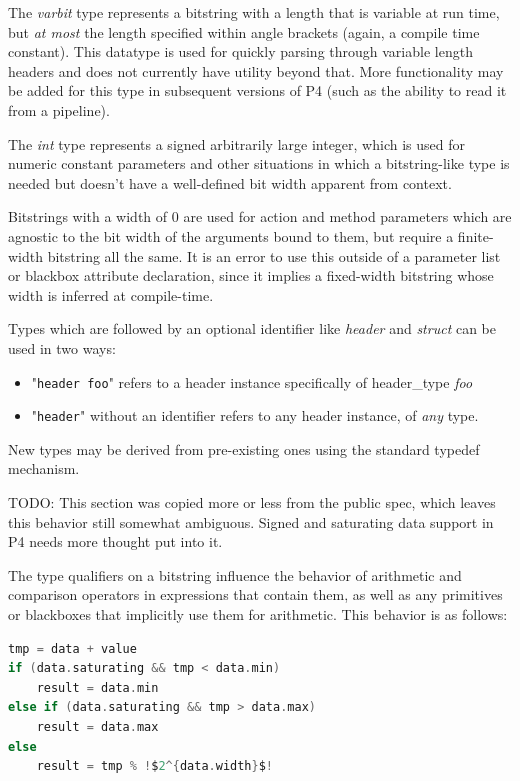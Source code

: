 \documentclass[12pt]{article}
\begin{document}
The \textit{varbit} type represents a bitstring with a length that is variable
at run time, but \textit{at most} the length specified within angle brackets
(again, a compile time constant). This datatype is used for quickly parsing
through variable length headers and does not currently have utility beyond
that. More functionality may be added for this type in subsequent versions of P4
(such as the ability to read it from a \matchaction pipeline).

The \textit{int} type represents a signed arbitrarily large integer, which is
used for numeric constant parameters and other situations in which a
bitstring-like type is needed but doesn't have a well-defined bit width
apparent from context.

Bitstrings with a width of 0 are used for action and method parameters which are
agnostic to the bit width of the arguments bound to them, but require a finite-
width bitstring all the same. It is an error to use this outside of a parameter
list or blackbox attribute declaration, since it implies a fixed-width bitstring
whose width is inferred at compile-time.

Types which are followed by an optional identifier like \textit{header} and
\textit{struct} can be used in two ways:
\begin{itemize}
\item
    "\texttt{header foo}" refers to a header instance specifically of
    header_type \textit{foo}
\item
    "\texttt{header}" without an identifier refers to any header instance,
    of \textit{any} type.
\end{itemize}

New types may be derived from pre-existing ones using the standard typedef
mechanism.


TODO: This section was copied more or less from the public spec, which leaves
this behavior still somewhat ambiguous. Signed and saturating data support in P4
needs more thought put into it.


The type qualifiers on a bitstring influence the behavior of arithmetic and
comparison operators in expressions that contain them, as well as any primitives
or blackboxes that implicitly use them for arithmetic. This behavior is as
follows:

\begin{lstlisting}[language=C,frame=single,backgroundcolor=\color{nonp4orange},escapechar=!]
tmp = data + value
if (data.saturating && tmp < data.min)
    result = data.min
else if (data.saturating && tmp > data.max)
    result = data.max
else
    result = tmp % !$2^{data.width}$!
\end{lstlisting}
\end{document}
